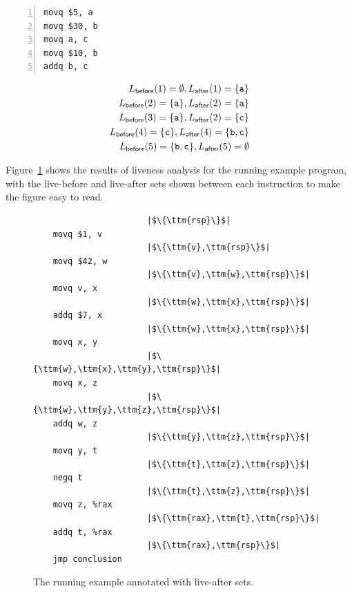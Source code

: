 \documentclass[11pt]{book}
\begin{document}
\begin{center}
\begin{minipage}{0.45\textwidth}
\begin{lstlisting}[numbers=left,numberstyle=\tiny]
movq $5, a
movq $30, b
movq a, c
movq $10, b
addq b, c
\end{lstlisting}
\end{minipage}
\vrule\hspace{10pt}
\begin{minipage}{0.45\textwidth}
\begin{align*}
L_{\mathsf{before}}(1)=  \emptyset, 
L_{\mathsf{after}}(1)=  \{\mathtt{a}\}\\
L_{\mathsf{before}}(2)=  \{\mathtt{a}\},
L_{\mathsf{after}}(2)=  \{\mathtt{a}\}\\
L_{\mathsf{before}}(3)=  \{\mathtt{a}\},
L_{\mathsf{after}}(2)=  \{\mathtt{c}\}\\
L_{\mathsf{before}}(4)=  \{\mathtt{c}\},
L_{\mathsf{after}}(4)=  \{\mathtt{b},\mathtt{c}\}\\
L_{\mathsf{before}}(5)=  \{\mathtt{b},\mathtt{c}\},
L_{\mathsf{after}}(5)=  \emptyset
\end{align*}
\end{minipage}
\end{center}

Figure~\ref{fig:live-eg} shows the results of liveness analysis for
the running example program, with the live-before and live-after sets
shown between each instruction to make the figure easy to read.

\begin{figure}[tp]
\hspace{20pt}
\begin{minipage}{0.45\textwidth}
\begin{lstlisting}
                       |$\{\ttm{rsp}\}$|    
    movq $1, v
                       |$\{\ttm{v},\ttm{rsp}\}$|    
    movq $42, w
                       |$\{\ttm{v},\ttm{w},\ttm{rsp}\}$|    
    movq v, x
                       |$\{\ttm{w},\ttm{x},\ttm{rsp}\}$|    
    addq $7, x
                       |$\{\ttm{w},\ttm{x},\ttm{rsp}\}$|    
    movq x, y
                       |$\{\ttm{w},\ttm{x},\ttm{y},\ttm{rsp}\}$|    
    movq x, z
                       |$\{\ttm{w},\ttm{y},\ttm{z},\ttm{rsp}\}$|    
    addq w, z
                       |$\{\ttm{y},\ttm{z},\ttm{rsp}\}$|
    movq y, t
                       |$\{\ttm{t},\ttm{z},\ttm{rsp}\}$|    
    negq t
                       |$\{\ttm{t},\ttm{z},\ttm{rsp}\}$|    
    movq z, %rax
                       |$\{\ttm{rax},\ttm{t},\ttm{rsp}\}$|    
    addq t, %rax
                       |$\{\ttm{rax},\ttm{rsp}\}$|
    jmp conclusion
\end{lstlisting}
\end{minipage}

\caption{The running example annotated with live-after sets.}
\label{fig:live-eg}
\end{figure}
\end{document}
